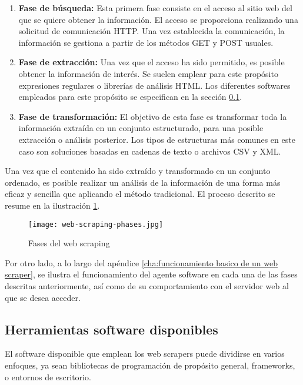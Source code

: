 \begin{enumerate}
\item {\bfseries Fase de búsqueda:} Esta primera fase consiste en el acceso al sitio web del que se
quiere obtener la información. El acceso se proporciona realizando una solicitud de comunicación HTTP.
Una vez establecida la comunicación, la información se gestiona a partir de los métodos GET y POST usuales.

\item {\bfseries Fase de extracción:} Una vez que el acceso ha sido permitido, es posible obtener la
información de interés. Se suelen emplear para este propósito expresiones regulares o librerías de
análisis HTML. Los diferentes softwares empleados para este propósito se especifican en la sección
\ref{subsec:herramientas software disponibles}.

\item {\bfseries Fase de transformación:} El objetivo de esta fase es transformar toda la información
extraída en un conjunto estructurado, para una posible extracción o análisis posterior. Los tipos de
estructuras más comunes en este caso son soluciones basadas en cadenas de texto o archivos CSV y XML.
\end{enumerate}

Una vez que el contenido ha sido extraído y transformado en un conjunto ordenado, es posible realizar un
análisis de la información de una forma más eficaz y sencilla que aplicando el método tradicional. El
proceso descrito se resume en la ilustración \ref{img:web-scraping-phases}.

\begin{figure}[tphb]
\centering
\texttt{[image: web-scraping-phases.jpg]}
\caption{Fases del web scraping}
\label{img:web-scraping-phases}
\end{figure}

Por otro lado, a lo largo del apéndice \ref{cha:funcionamiento basico de un web scraper}, se ilustra el
funcionamiento del agente software en cada una de las fases descritas anteriormente, así como de su
comportamiento con el servidor web al que se desea acceder.

\subsection{Herramientas software disponibles}
\label{subsec:herramientas software disponibles}
El software disponible que emplean los web scrapers puede dividirse en varios enfoques, ya sean bibliotecas
de programación de propósito general, frameworks, o entornos de escritorio.

